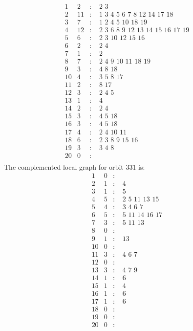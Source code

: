 \documentclass[12pt]{article}
\begin{document}
\begin{equation*}
\begin{array}{rrcl}
1&2&:&\,\,2\,\,3\\
2&11&:&\,\,1\,\,3\,\,4\,\,5\,\,6\,\,7\,\,8\,\,12\,\,14\,\,17\,\,18\\
3&7&:&\,\,1\,\,2\,\,4\,\,5\,\,10\,\,18\,\,19\\
4&12&:&\,\,2\,\,3\,\,6\,\,8\,\,9\,\,12\,\,13\,\,14\,\,15\,\,16\,\,17\,\,19\\
5&6&:&\,\,2\,\,3\,\,10\,\,12\,\,15\,\,16\\
6&2&:&\,\,2\,\,4\\
7&1&:&\,\,2\\
8&7&:&\,\,2\,\,4\,\,9\,\,10\,\,11\,\,18\,\,19\\
9&3&:&\,\,4\,\,8\,\,18\\
10&4&:&\,\,3\,\,5\,\,8\,\,17\\
11&2&:&\,\,8\,\,17\\
12&3&:&\,\,2\,\,4\,\,5\\
13&1&:&\,\,4\\
14&2&:&\,\,2\,\,4\\
15&3&:&\,\,4\,\,5\,\,18\\
16&3&:&\,\,4\,\,5\,\,18\\
17&4&:&\,\,2\,\,4\,\,10\,\,11\\
18&6&:&\,\,2\,\,3\,\,8\,\,9\,\,15\,\,16\\
19&3&:&\,\,3\,\,4\,\,8\\
20&0&:&\\
\end{array}
\end{equation*}
The complemented local graph for orbit $331$ is:
\begin{equation*}
\begin{array}{rrcl}
1&0&:&\\
2&1&:&\,\,4\\
3&1&:&\,\,5\\
4&5&:&\,\,2\,\,5\,\,11\,\,13\,\,15\\
5&4&:&\,\,3\,\,4\,\,6\,\,7\\
6&5&:&\,\,5\,\,11\,\,14\,\,16\,\,17\\
7&3&:&\,\,5\,\,11\,\,13\\
8&0&:&\\
9&1&:&\,\,13\\
10&0&:&\\
11&3&:&\,\,4\,\,6\,\,7\\
12&0&:&\\
13&3&:&\,\,4\,\,7\,\,9\\
14&1&:&\,\,6\\
15&1&:&\,\,4\\
16&1&:&\,\,6\\
17&1&:&\,\,6\\
18&0&:&\\
19&0&:&\\
20&0&:&\\
\end{array}
\end{equation*}
\end{document}
